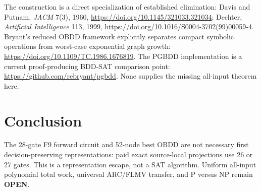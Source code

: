 \documentclass[11pt]{article}
\begin{document}
The construction is a direct specialization of established elimination:
Davis and Putnam, \emph{JACM} 7(3), 1960,
\url{https://doi.org/10.1145/321033.321034}; Dechter,
\emph{Artificial Intelligence} 113, 1999,
\url{https://doi.org/10.1016/S0004-3702(99)00059-4}.  Bryant's reduced OBDD
framework explicitly separates compact symbolic operations from worst-case
exponential graph growth:
\url{https://doi.org/10.1109/TC.1986.1676819}.  The PGBDD implementation is
a current proof-producing BDD-SAT comparison point:
\url{https://github.com/rebryant/pgbdd}.  None supplies the missing
all-input theorem here.

\section{Conclusion}

The 28-gate F9 forward circuit and 52-node best OBDD are not necessary first
decision-preserving representations: paid exact source-local projections use
26 or 27 gates.  This is a representation escape, not a SAT algorithm.
Uniform all-input polynomial total work, universal ARC/FLMV transfer, and
P versus NP remain \textbf{OPEN}.
\end{document}
